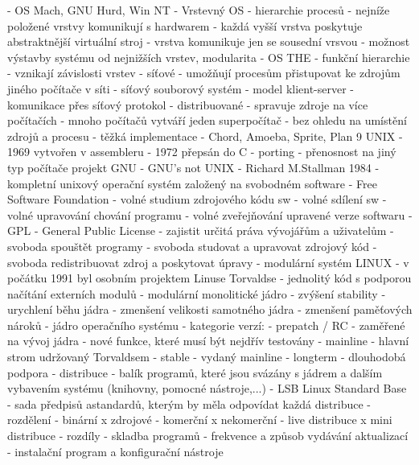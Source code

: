     - OS Mach, GNU Hurd, Win NT
- Vrstevný OS
    - hierarchie procesů
        - nejníže položené vrstvy komunikují s hardwarem
        - každá vyšší vrstva poskytuje abstraktnější virtuální stroj
        - vrstva komunikuje jen se sousední vrsvou
        - možnost výstavby systému od nejnižších vrstev, modularita
        - OS THE
    - funkční hierarchie
        - vznikají závislosti vrstev
- síťové
    - umožňují procesům přistupovat ke zdrojům jiného počítače v síti
    - síťový souborový systém
    - model klient-server
    - komunikace přes síťový protokol
- distribuované 
    - spravuje zdroje na více počítačích
    - mnoho počítačů vytváří jeden superpočítač
    - bez ohledu na umístění zdrojů a procesu
    - těžká implementace
    - Chord, Amoeba, Sprite, Plan 9
UNIX
- 1969 vytvořen v assembleru
- 1972 přepsán do C
- porting - přenosnost na jiný typ počítače
    projekt GNU - GNU's not UNIX
        - Richard M.Stallman 1984
        - kompletní unixový operační systém založený na svobodném software
        - Free Software Foundation
            - volné studium zdrojového kódu sw
            - volné sdílení sw
            - volné upravování chování programu
            - volné zveřejňování upravené verze softwaru
        - GPL - General Public License
            - zajistit určitá práva vývojářům a uživatelům
            - svoboda spouštět programy
            - svoboda studovat a upravovat zdrojový kód
            - svoboda redistribuovat zdroj a poskytovat úpravy
        - modulární systém
LINUX
- v počátku 1991 byl osobním projektem Linuse Torvaldse
- jednolitý kód s podporou načítání externích modulů
    - modulární monolitické jádro
        - zvýšení stability
        - urychlení běhu jádra
        - zmenšení velikosti samotného jádra
        - zmenšení paměťových nároků
- jádro operačního systému
- kategorie verzí:
    - prepatch / RC
        - zaměřené na vývoj jádra
        - nové funkce, které musí být nejdřív testovány
    - mainline
        - hlavní strom udržovaný Torvaldsem
    - stable
        - vydaný mainline
    - longterm
        - dlouhodobá podpora
- distribuce
    - balík programů, které jsou svázány s jádrem a dalším vybavením systému (knihovny, pomocné nástroje,...)
    - LSB Linux Standard Base
        - sada předpisů astandardů, kterým by měla odpovídat každá distribuce
    - rozdělení
        - binární x zdrojové
        - komerční x nekomerční
        - live distribuce x mini distribuce
    - rozdíly  
        - skladba programů
        - frekvence a způsob vydávání aktualizací
        - instalační program a konfigurační nástroje
